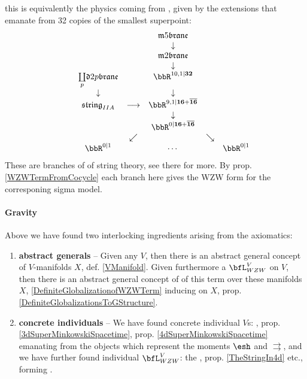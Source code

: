 \documentclass[12pt,titlepage]{article}
\newcommand{\itexarray}[1]{\begin{matrix}#1\end{matrix}}
\theoremstyle{plain}
\theoremstyle{definition}
\theoremstyle{remark}
\begin{document}
this is equivalently the physics coming from , given by the extensions that emanate from 32 copies of the smallest superpoint:
\begin{displaymath}
\itexarray{
&& && \mathfrak{m}5\mathfrak{brane}
\\
&& && \downarrow
\\
&& && \mathfrak{m}2\mathfrak{brane}
\\
&& && \downarrow
\\
&& \underset{p}{\coprod} \mathfrak{d}{2p}\mathfrak{brane} && \bbR^{10,1|\mathbf{32}}
\\
&& \downarrow && \downarrow
\\
&& \mathfrak{string}_{IIA} &\longrightarrow & \bbR^{9,1|\mathbf{16}+\overline{\mathbf{16}}}
\\
&& && \downarrow
\\
&& && \bbR^{0|\mathbf{16}+\overline{\mathbf{16}}}
\\
&& & \swarrow && \searrow
\\
&& \bbR^{0|1} && \cdots  && \bbR^{0|1}
}
\end{displaymath}
These are branches of  of string theory, see there for more. By prop. \ref{WZWTermFromCocycle} each branch here gives the WZW form for the corresponing  sigma model.
\hypertarget{gravity}{}\paragraph*{{Gravity}}\label{gravity}
Above we have found two interlocking ingredients arising from the axiomatics:
\begin{enumerate}%
\item \textbf{abstract generals} -- Given any  $V$, then there is an abstract general concept of $V$-manifolds $X$, def. \ref{VManifold}. Given furthermore a  $\bfL_{WZW}^V$ on $V$, then there is an abstract general concept of  of this term over these manifolds $X$, \ref{DefiniteGlobalizationofWZWTerm} inducing  on $X$, prop. \ref{DefiniteGlobalizationsToGStructure}.
\item \textbf{concrete individuals} -- We have found concrete individual $V$s: , prop. \ref{3dSuperMinkowskiSpacetime}, prop. \ref{4dSuperMinkowskiSpacetime} emanating from the objects which represent the moments $\esh $ and $\rightrightarrows$, and we have further found individual $\bfL_{WZW}^V$: the , prop. \ref{TheStringIn4d} etc., forming .
\end{enumerate}
\end{document}
